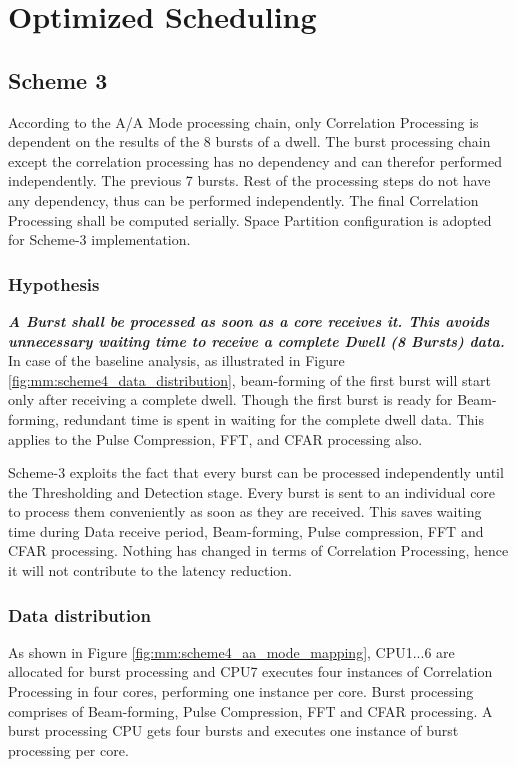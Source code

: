 \chapter{Optimized Scheduling}
\label{chap:mode_mapping}

\section{Scheme 3}
\label{sec:mm:scheme4}
According to the A/A Mode processing chain, only Correlation Processing is dependent on the results of the 8 bursts of a dwell. The burst processing chain except the correlation processing has no dependency and can therefor performed independently. The previous 7 bursts. Rest of the processing steps do not have any dependency, thus can be performed independently. The final Correlation Processing shall be computed serially. Space Partition configuration is adopted for Scheme-3 implementation.

\subsection{Hypothesis}
\textbf{\textsl{A Burst shall be processed as soon as a core receives it. This avoids unnecessary waiting time to receive a complete Dwell (8 Bursts) data.}}\\[0.2cm]
In case of the baseline analysis, as illustrated in Figure \ref{fig:mm:scheme4_data_distribution}, beam-forming of the first burst will start only after receiving a complete dwell. Though the first burst is ready for Beam-forming, redundant time is spent in waiting for the complete dwell data. This applies to the Pulse Compression, FFT, and CFAR processing also.

Scheme-3 exploits the fact that every burst can be processed independently until the Thresholding and Detection stage. Every burst is sent to an individual core to process them conveniently as soon as they are received. This saves waiting time during Data receive period, Beam-forming, Pulse compression, FFT and CFAR processing. Nothing has changed in terms of Correlation Processing, hence it will not contribute to the latency reduction.

\subsection{Data distribution}
As shown in Figure \ref{fig:mm:scheme4_aa_mode_mapping}, CPU1...6 are allocated for burst processing and CPU7 executes four instances of Correlation Processing in four cores, performing one instance per core. Burst processing comprises of Beam-forming, Pulse Compression, FFT and CFAR processing. A burst processing CPU gets four bursts and executes one instance of burst processing per core.

